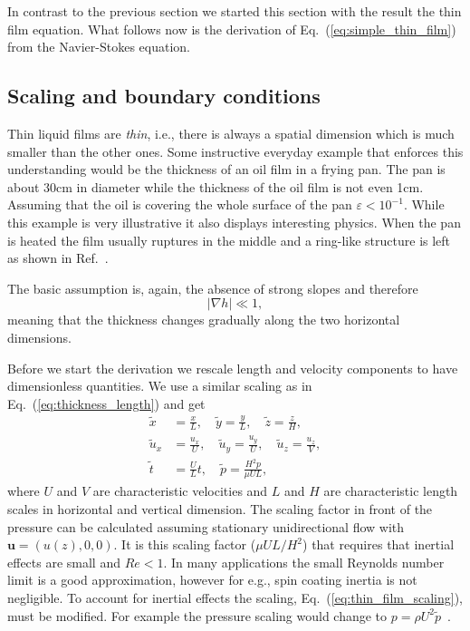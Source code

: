 In contrast to the previous section we started this section with the result the thin film equation.
What follows now is the derivation of Eq.~(\ref{eq:simple_thin_film}) from the Navier-Stokes equation.

\subsection{Scaling and boundary conditions}
\label{subsec:thin_film_scaling}
Thin liquid films are \textit{thin}, i.e., there is always a spatial dimension which is much smaller than the other ones. 
Some instructive everyday example that enforces this understanding would be the thickness of an oil film in a frying pan. 
The pan is about 30cm in diameter while the thickness of the oil film is not even 1cm.
Assuming that the oil is covering the whole surface of the pan $\varepsilon < 10^{-1}$.
While this example is very illustrative it also displays interesting physics.
When the pan is heated the film usually ruptures in the middle and a ring-like structure is left as shown in Ref.~\cite{fedorchenkoFormationDrySpots2021}.

The basic assumption is, again, the absence of strong slopes and therefore
\begin{equation}\label{eq:small_slopes}
    |\nabla h| \ll 1,  
\end{equation}
meaning that the thickness changes gradually along the two horizontal dimensions.

Before we start the derivation we rescale length and velocity components to have dimensionless quantities.
We use a similar scaling as in Eq.~(\ref{eq:thickness_length}) and get 
\begin{align}\label{eq:thin_film_scaling}
    \tilde{x} &= \frac{x}{L},\quad \tilde{y} = \frac{y}{L},\quad \tilde{z} = \frac{z}{H},\nonumber \\
    \tilde{u}_x &= \frac{u_x}{U},\quad \tilde{u}_y = \frac{u_y}{U},\quad \tilde{u}_z = \frac{u_z}{V},\nonumber \\
    \tilde{t} &= \frac{U}{L} t,\quad \tilde{p} = \frac{H^2 p}{\mu U L}, 
\end{align}
where $U$ and $V$ are characteristic velocities and $L$ and $H$ are characteristic length scales in horizontal and vertical dimension.
The scaling factor in front of the pressure can be calculated assuming stationary unidirectional flow with $\mathbf{u} = (u(z), 0, 0)$.
It is this scaling factor ($\mu U L /H^2$) that requires that inertial effects are small and $Re<1$.
In many applications the small Reynolds number limit is a good approximation, however for e.g., spin coating inertia is not negligible.
To account for inertial effects the scaling, Eq.~(\ref{eq:thin_film_scaling}), must be modified. 
For example the pressure scaling would change to $p = \rho U^2\tilde{p}$~\cite{crasterDynamicsStabilityThin2009}.

